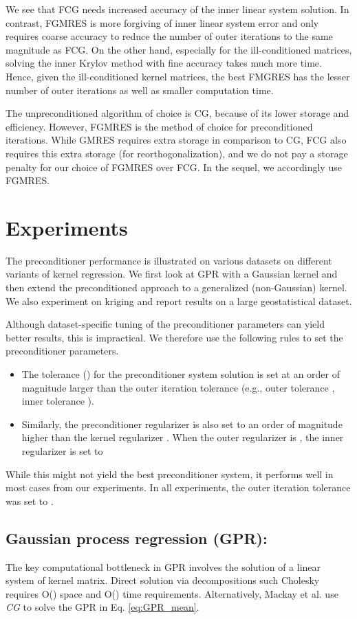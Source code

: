 \documentclass[10pt,journal,letterpaper,compsoc]{IEEEtran}
\begin{document}
We see that FCG needs increased accuracy of the inner linear system solution. In contrast, FGMRES is more forgiving of inner linear system error and only requires coarse accuracy to reduce the number of outer iterations to the same magnitude as FCG. On the other hand, especially for the ill-conditioned matrices, solving the inner Krylov method with fine accuracy takes much more time. Hence, given the ill-conditioned kernel matrices, the best FMGRES has the lesser number of outer iterations as well as smaller computation time.

The unpreconditioned algorithm of choice is CG, because of its lower storage and efficiency. However, FGMRES is the method of choice for preconditioned iterations. While GMRES requires extra storage in comparison to CG, FCG also requires this extra storage (for reorthogonalization), and we do not pay a storage penalty for our choice of FGMRES over FCG. In the sequel, we accordingly use FGMRES.

\section{Experiments\label{sec:Experiments}}
The preconditioner performance is illustrated on various datasets on different variants of kernel regression. We first look at GPR with a Gaussian kernel and then extend the preconditioned approach to a generalized (non-Gaussian) kernel. We also experiment on kriging \cite{AppliedGeostatistics} and report results on a large geostatistical dataset.

Although dataset-specific tuning of the preconditioner parameters can yield better results, this is impractical. We therefore use the following rules to set the preconditioner parameters.
\begin{itemize}
    \item The tolerance () for the preconditioner system solution is set at an order of magnitude larger than the outer iteration tolerance (e.g., outer tolerance , inner tolerance ).
    \item Similarly, the preconditioner regularizer  is also set to an order of magnitude higher than the kernel regularizer . When the outer regularizer is , the inner regularizer is set to 
\end{itemize}
While this might not yield the best preconditioner system, it performs well in most cases from our experiments. In all experiments, the outer iteration tolerance was set to .

\subsection{Gaussian process regression (GPR): } The key computational bottleneck in GPR involves the solution of a linear system of kernel matrix. Direct solution via decompositions such Cholesky \cite{GPML_Rasmussen} requires O() space and O() time requirements. Alternatively, Mackay et al. \cite{GPML_Mackay} use \emph{CG} to solve the GPR in Eq. \ref{eq:GPR_mean}.
\end{document}
